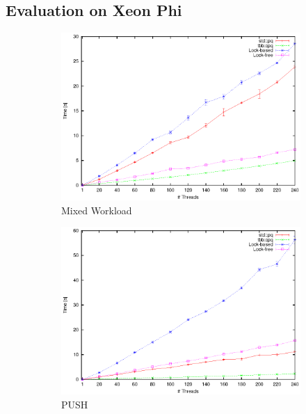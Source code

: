 \subsection{Evaluation on Xeon Phi}
\begin{figure}[t]
	\centering
	\begin{subfigure}[b]{0.3\textwidth}
		\centering
		\includegraphics[width=\textwidth]{../plots/xp_mixed/runtime_mixed}
		\caption{Mixed Workload}
		\label{fig:xp_mixed}
	\end{subfigure}
	\hfill
	\begin{subfigure}[b]{0.3\textwidth}
		\centering
		\includegraphics[width=\textwidth]{../plots/xp_push/runtime_push}
		\caption{PUSH}
		\label{fig:xp_push}
	\end{subfigure}
	\hfill
	\begin{subfigure}[b]{0.3\textwidth}

\end{subfigure}
\end{figure}
